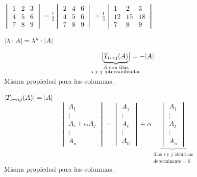 \documentclass[11pt,a4paper]{article}
\begin{document}
\begin{ejemplo}
\begin{center}
$\displaystyle
\begin{vmatrix}1&2&3\\4&5&6\\7&8&9\end{vmatrix}
=\frac12\begin{vmatrix}2&4&6\\4&5&6\\7&8&9\end{vmatrix}
=\frac13\begin{vmatrix}1&2&3\\12&15&18\\7&8&9\end{vmatrix}$
\end{center}
\end{ejemplo}

\begin{corolario}
$\lvert\lambda\cdot A\rvert=\lambda^n\cdot\lvert A\rvert$
\end{corolario}

\begin{proposicion}
\[
\abs[\big]{\smash[b]{\underbrace{T_{i\leftrightarrow j}(A)}_{\mathclap{\substack{A\text{ con filas}\\ i\text{ y } j\text{ intercambiadas}}}}}}=-\abs{A}\vphantom{\underbrace{T}_{\substack{A\\A}}}
\]
Misma propiedad para las columnas.
\end{proposicion}

\begin{proposicion}[corolario]
$\lvert T_{i+\alpha j}(A)\rvert=\lvert A\rvert$
\[
\begin{vmatrix}A_1\\\vdots\\A_i+\alpha A_j\\\vdots\\A_n\end{vmatrix}
=\begin{vmatrix}A_1\\\vdots\\A_i\\\vdots\\A_n\end{vmatrix}
+\alpha\underbrace{\begin{vmatrix}A_1\\\vdots\\A_j\\\vdots\\A_n\end{vmatrix}}_{\substack{\text{filas } i\text{ y } j\text{ idénticas}\\ \text{determinante}=0}}
\]
Misma propiedad para las columnas.
\end{proposicion}
\end{document}

